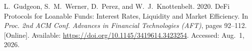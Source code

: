{\begin{enumerate}[label={[\arabic*]}]
\item L.~Gudgeon, S.~M.~Werner, D.~Perez, and W.~J.~Knottenbelt. 2020. DeFi Protocols for Loanable Funds: Interest Rates, Liquidity and Market Efficiency. In \emph{Proc. 2nd ACM Conf. Advances in Financial Technologies (AFT)}, pages 92--112. [Online]. Available: \url{https://doi.org/10.1145/3419614.3423254}. Accessed: Aug.~1, 2026.









\end{enumerate}}
